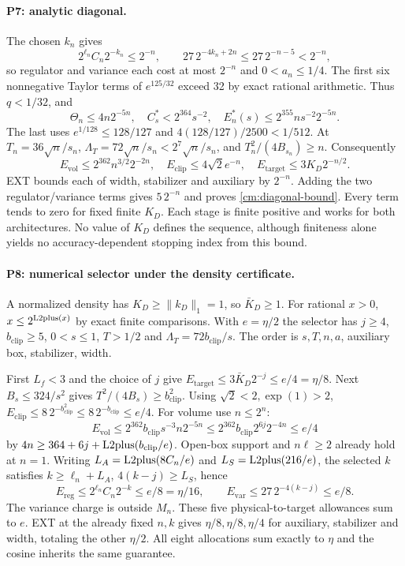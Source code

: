 \paragraph{P7: analytic diagonal.}
The chosen $k_n$ gives
\[
 2^{\ell_n}C_n2^{-k_n}\le2^{-n},\qquad
 27\,2^{-4k_n+2n}\le27\,2^{-n-5}<2^{-n},
\]
so regulator and variance each cost at most $2^{-n}$ and $0<a_n\le1/4$.
The first six nonnegative Taylor terms of $e^{125/32}$ exceed 32 by
exact rational arithmetic. Thus $q<1/32$, and
\[
 \Theta_n\le4n2^{-5n},\quad C_s^*<2^{364}s^{-2},\quad
 E_n^*(s)\le2^{355}ns^{-2}2^{-5n}.
\]
The last uses $e^{1/128}\le128/127$ and
$4(128/127)/2500<1/512$.
At $T_n=36\sqrt n/s_n$, $\Lambda_T=72\sqrt n/s_n<2^7\sqrt n/s_n$,
and $T_n^2/(4B_{s_n})\ge n$. Consequently
\[
 E_{\mathrm{vol}}\le2^{362}n^{3/2}2^{-2n},\quad
 E_{\mathrm{clip}}\le4\sqrt2e^{-n},\quad
 E_{\mathrm{target}}\le3K_D2^{-n/2}.
\]
EXT bounds each of width, stabilizer and auxiliary by $2^{-n}$.
Adding the two regulator/variance terms gives $5\,2^{-n}$ and proves
\eqref{cm:diagonal-bound}. Every term tends to zero for fixed finite $K_D$.
Each stage is finite positive and works for both architectures.
No value of $K_D$ defines the sequence, although finiteness alone yields no
accuracy-dependent stopping index from this bound.

\paragraph{P8: numerical selector under the density certificate.}
A normalized density has $K_D\ge\|k_D\|_1=1$, so $\bar K_D\ge1$.
For rational $x>0$, $x\le2^{\operatorname{L2plus}(x)}$ by exact finite comparisons.
With $e=\eta/2$ the selector has $j\ge4$, $b_{\mathrm{clip}}\ge5$,
$0<s\le1$, $T>1/2$ and $\Lambda_T=72b_{\mathrm{clip}}/s$.
The order is $s,T,n,a$, auxiliary box, stabilizer, width.

First $L_f<3$ and the choice of $j$ give
$E_{\mathrm{target}}\le3\bar K_D2^{-j}\le e/4=\eta/8$.
Next $B_s\le324/s^2$ gives $T^2/(4B_s)\ge b_{\mathrm{clip}}^2$.
Using $\sqrt2<2,\exp(1)>2$,
$E_{\mathrm{clip}}\le8\,2^{-b_{\mathrm{clip}}^2}
\le8\,2^{-b_{\mathrm{clip}}}\le e/4$.
For volume use $n\le2^n$:
\[
 E_{\mathrm{vol}}\le2^{362}b_{\mathrm{clip}}s^{-3}n2^{-5n}
 \le2^{362}b_{\mathrm{clip}}2^{6j}2^{-4n}\le e/4
\]
by $4n\ge364+6j+\operatorname{L2plus}(b_{\mathrm{clip}}/e)$.
Open-box support and $n\ell\ge2$ already hold at $n=1$.
Writing $L_A=\operatorname{L2plus}(8C_n/e)$ and $L_S=\operatorname{L2plus}(216/e)$, the
selected $k$ satisfies $k\ge\ell_n+L_A$, $4(k-j)\ge L_S$, hence
\[
 E_{\mathrm{reg}}\le2^{\ell_n}C_n2^{-k}\le e/8=\eta/16,\qquad
 E_{\mathrm{var}}\le27\,2^{-4(k-j)}\le e/8.
\]
The variance charge is outside $M_n$. These five physical-to-target
allowances sum to $e$. EXT at the already fixed $n,k$ gives
$\eta/8,\eta/8,\eta/4$ for auxiliary, stabilizer and width, totaling
the other $\eta/2$. All eight allocations sum exactly to $\eta$ and
the cosine inherits the same guarantee.

